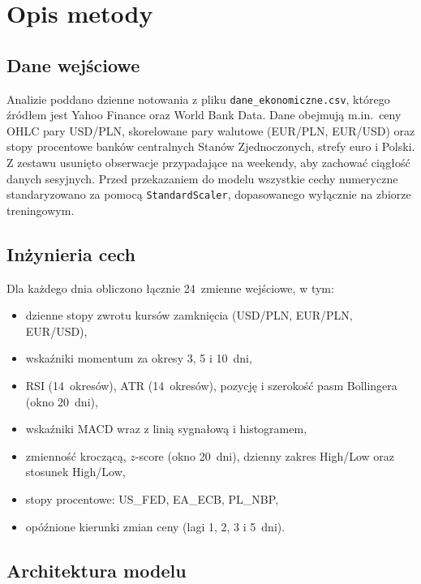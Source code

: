 \section*{Opis metody}

\subsection*{Dane wejściowe}

Analizie poddano dzienne notowania z pliku \texttt{dane\_ekonomiczne.csv}, którego źródłem jest Yahoo Finance oraz World Bank Data.
Dane obejmują m.in.\ ceny OHLC pary USD/PLN, skorelowane pary walutowe (EUR/PLN, EUR/USD)
oraz stopy procentowe banków centralnych Stanów Zjednoczonych, strefy euro i Polski.
Z zestawu usunięto obserwacje przypadające na weekendy, aby zachować ciągłość danych sesyjnych.
Przed przekazaniem do modelu wszystkie cechy numeryczne standaryzowano za pomocą \texttt{StandardScaler},
dopasowanego wyłącznie na zbiorze treningowym.

\subsection*{Inżynieria cech}

Dla każdego dnia obliczono łącznie 24~zmienne wejściowe, w tym:
\begin{itemize}
    \item dzienne stopy zwrotu kursów zamknięcia (USD/PLN, EUR/PLN, EUR/USD),
    \item wskaźniki momentum za okresy 3, 5 i 10~dni,
    \item RSI (14~okresów), ATR (14~okresów), pozycję i szerokość pasm Bollingera (okno 20~dni),
    \item wskaźniki MACD wraz z linią sygnałową i histogramem,
    \item zmienność kroczącą, $z$-score (okno 20~dni), dzienny zakres High/Low oraz stosunek High/Low,
    \item stopy procentowe: US\_FED, EA\_ECB, PL\_NBP,
    \item opóźnione kierunki zmian ceny (lagi 1, 2, 3 i 5~dni).
\end{itemize}

\subsection*{Architektura modelu}

